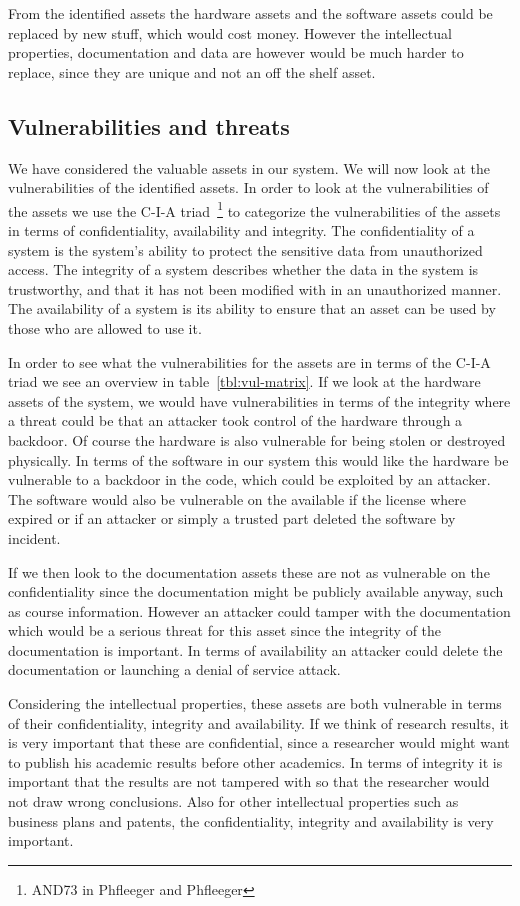 From the identified assets the hardware assets and the software assets could be replaced by new stuff, which would cost money. However the intellectual properties, documentation and data are however would be much harder to replace, since they are unique and not an off the shelf asset.

\subsection{Vulnerabilities and threats}
We have considered the valuable assets in our system. We will now look at the vulnerabilities of the identified assets. In order to look at the vulnerabilities of the assets we use the C-I-A triad~\footnote{AND73 in Phfleeger and Phfleeger} to categorize the vulnerabilities of the assets in terms of confidentiality, availability and integrity. The confidentiality of a system is the system’s ability to protect the sensitive data from unauthorized access. The integrity of a system describes whether the data in the system is trustworthy, and that it has not been modified with in an unauthorized manner. The availability of a system is its ability to ensure that an asset can be used by those who are allowed to use it.

In order to see what the vulnerabilities for the assets are in terms of the C-I-A triad we see an overview in table~\ref{tbl:vul-matrix}. If we look at the hardware assets of the system, we would have vulnerabilities in terms of the integrity where a threat could be that an attacker took control of the hardware through a backdoor. Of course the hardware is also vulnerable for being stolen or destroyed physically. In terms of the software in our system this would like the hardware be vulnerable to a backdoor in the code, which could be exploited by an attacker. The software would also be vulnerable on the available if the license where expired or if an attacker or simply a trusted part deleted the software by incident.

If we then look to the documentation assets these are not as vulnerable on the confidentiality since the documentation might be publicly available anyway, such as course information. However an attacker could tamper with the documentation which would be a serious threat for this asset since the integrity of the documentation is important. In terms of availability an attacker could delete the documentation or launching a denial of service attack.

Considering the intellectual properties, these assets are both vulnerable in terms of their confidentiality, integrity and availability. If we think of research results, it is very important that these are confidential, since a researcher would might want to publish his academic results before other academics. In terms of integrity it is important that the results are not tampered with so that the researcher would not draw wrong conclusions. Also for other intellectual properties such as business plans and patents, the confidentiality, integrity and availability is very important.

